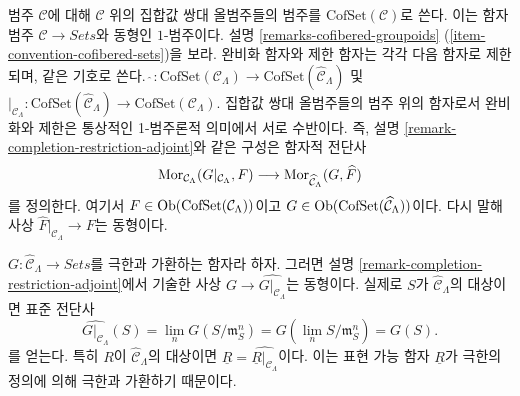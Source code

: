 \begin{remark}
\label{remark-completion-restriction-cofset-adjoint}
범주 $\mathcal{C}$에 대해 $\mathcal{C}$ 위의 집합값 쌍대
올범주들의 범주를 $\text{CofSet}(\mathcal{C})$로 쓴다. 이는 함자 범주
$\mathcal{C} \to \textit{Sets}$와 동형인 $1$-범주이다.%
설명 \ref{remarks-cofibered-groupoids}
(\ref{item-convention-cofibered-sets})을 보라.
완비화 함자와 제한 함자는 각각 다음 함자로 제한되며, 같은 기호로 쓴다.
$\widehat{~} : \text{CofSet}(\mathcal{C}_\Lambda) \to
\text{CofSet}(\widehat{\mathcal{C}}_\Lambda)$ 및
$|_{\mathcal{C}_\Lambda} : \text{CofSet}(\widehat{\mathcal{C}}_\Lambda) \to
\text{CofSet}(\mathcal{C}_\Lambda)$.
집합값 쌍대 올범주들의 범주 위의 함자로서 완비화와 제한은 통상적인
1-범주론적 의미에서 서로 수반이다. 즉, 설명
\ref{remark-completion-restriction-adjoint}와 같은 구성은 함자적 전단사
$$
\mathop{\mathrm{Mor}}\nolimits_{\mathcal{C}_\Lambda}(G|_{\mathcal{C}_\Lambda}, F)
\longrightarrow
\mathop{\mathrm{Mor}}\nolimits_{\widehat{\mathcal{C}}_\Lambda}(G, \widehat{F})
$$
를 정의한다. 여기서 $F \in \mathop{\mathrm{Ob}}\nolimits(\text{CofSet}(\mathcal{C}_\Lambda))$이고
$G \in \mathop{\mathrm{Ob}}\nolimits(\text{CofSet}(\widehat{\mathcal{C}}_\Lambda))$이다.
다시 말해 사상 $\widehat{F}|_{\mathcal{C}_\Lambda} \to F$는
동형이다.
\end{remark}

\begin{remark}
\label{remark-restrict-complete-continuous-functor}
$G : \widehat{\mathcal{C}}_\Lambda \to \textit{Sets}$를 극한과
가환하는 함자라 하자. 그러면 설명
\ref{remark-completion-restriction-adjoint}에서 기술한 사상
$G \to \widehat{G|_{\mathcal{C}_\Lambda}}$는 동형이다. 실제로
$S$가 $\widehat{\mathcal{C}}_\Lambda$의 대상이면 표준 전단사
$$
\widehat{G|_{\mathcal{C}_\Lambda}}(S) =
\lim_n G(S/\mathfrak{m}_S^n) =
G(\lim_n S/\mathfrak{m}_S^n) = G(S).
$$
를 얻는다. 특히 $R$이 $\widehat{\mathcal{C}}_\Lambda$의 대상이면
$\underline{R} = \widehat{\underline{R}|_{\mathcal{C}_\Lambda}}$이다.
이는 표현 가능 함자 $\underline{R}$가 극한의 정의에 의해 극한과
가환하기 때문이다.
\end{remark}

